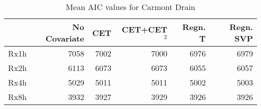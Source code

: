 \begin{table}
\caption{Mean AIC values for Carmont Drain}
\label{tab:aic}
\begin{tabular}{lrrrrr}
\toprule
 & No Covariate & CET & CET+CET$^2$ & Regn. T & Regn. SVP \\
\midrule
Rx1h & 7058 & 7002 & 7000 & 6976 & 6979 \\
Rx2h & 6113 & 6073 & 6073 & 6055 & 6057 \\
Rx4h & 5029 & 5011 & 5011 & 5002 & 5003 \\
Rx8h & 3932 & 3927 & 3929 & 3926 & 3926 \\
\bottomrule
\end{tabular}
\end{table}
